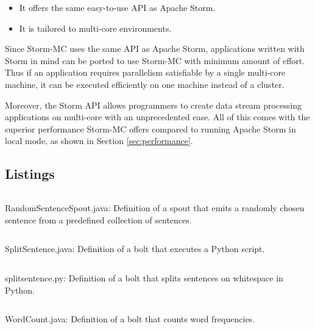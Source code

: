 \documentclass[bsc,deptreport,twoside,singlespacing,normalheadings,parskip]{infthesis}\usepackage[]{graphicx}\usepackage[]{color}
\begin{document}
\begin{itemize}
	\item It offers the same easy-to-use API as Apache Storm.
	\item It is tailored to multi-core environments.
\end{itemize}

Since Storm-MC uses the same API as Apache Storm, applications written with Storm in mind can be ported to use Storm-MC with minimum amount of effort. Thus if an application requires parallelism satisfiable by a single multi-core machine, it can be executed efficiently on one machine instead of a cluster.

Moreover, the Storm API allows programmers to create data stream processing applications on multi-core with an unprecedented ease. All of this comes with the superior performance Storm-MC offers compared to running Apache Storm in local mode, as shown in Section \ref{sec:performance}.\clearpage{}


\printbibliography

\begin{appendices}
	\clearpage{}\chapter{Listings}
\label{ch:listings}

\begin{listing}[!htb]
\inputminted[frame=lines,linenos]{java}{code/RandomSentenceSpout.java}
\caption[RandomSentenceSpout.java]{RandomSentenceSpout.java: Definition of a spout that emits a randomly chosen sentence from a predefined collection of sentences.}
\label{listing:wordcount_spout}
\end{listing}

\begin{listing}[!htb]
\inputminted[frame=lines,linenos]{java}{code/SplitSentence.java}
\caption[SplitSentence.java]{SplitSentence.java: Definition of a bolt that executes a Python script.}
\label{listing:wordcount_split}
\end{listing}

\begin{listing}[!htb]
\inputminted[frame=lines,linenos]{python}{code/splitsentence.py}
\caption[splitsentence.py]{splitsentence.py: Definition of a bolt that splits sentences on whitespace in Python.}
\label{listing:wordcount_split_py}
\end{listing}

\begin{listing}[!htb]
\inputminted[frame=lines,linenos]{java}{code/WordCount.java}
\caption[WordCount.java]{WordCount.java: Definition of a bolt that counts word frequencies.}
\label{listing:wordcount_count}
\end{listing}

\clearpage{}
\end{appendices}
\end{document}
